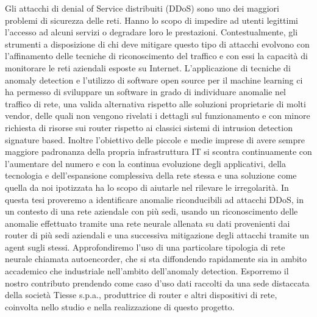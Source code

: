 


\italiano
\sommario

Gli attacchi di denial of Service distribuiti (DDoS) sono uno dei maggiori problemi di sicurezza delle reti. Hanno lo scopo di impedire ad utenti legittimi l'accesso ad alcuni servizi o degradare loro le prestazioni. Contestualmente, gli strumenti a disposizione di chi deve mitigare questo tipo di attacchi evolvono con l'affinamento delle tecniche di riconoscimento del traffico e con essi la capacità di monitorare le reti aziendali esposte su Internet. L'applicazione di tecniche di anomaly detection e l'utilizzo di software open source per il machine learning ci ha permesso di sviluppare un software in grado di individuare anomalie nel traffico di rete, una valida alternativa rispetto alle soluzioni proprietarie di molti vendor, delle quali non vengono rivelati i dettagli sul funzionamento e con minore richiesta di risorse sui router rispetto ai classici sistemi di intrusion detection signature based. Inoltre l'obiettivo delle piccole e medie imprese di avere sempre maggiore padronanza della propria infrastruttura IT si scontra continuamente con l'aumentare del numero e con la continua evoluzione degli applicativi, della tecnologia e dell'espansione complessiva della rete stessa e una soluzione come quella da noi ipotizzata ha lo scopo di aiutarle nel rilevare le irregolarità. In questa tesi proveremo a identificare anomalie riconducibili ad attacchi DDoS, in un contesto di una rete aziendale con più sedi, usando un riconoscimento delle anomalie effettuato tramite  una rete neurale allenata su dati provenienti dai router di più sedi aziendali e una successiva mitigazione degli attacchi tramite un agent sugli stessi. Approfondiremo l'uso di una particolare tipologia di rete neurale chiamata autoencorder, che si sta diffondendo rapidamente sia in ambito accademico che industriale nell'ambito dell'anomaly detection. Esporremo il nostro contributo prendendo come caso d'uso dati raccolti da una sede distaccata della società Tiesse s.p.a., produttrice di router e altri dispositivi di rete, coinvolta nello studio e nella realizzazione di questo progetto.


